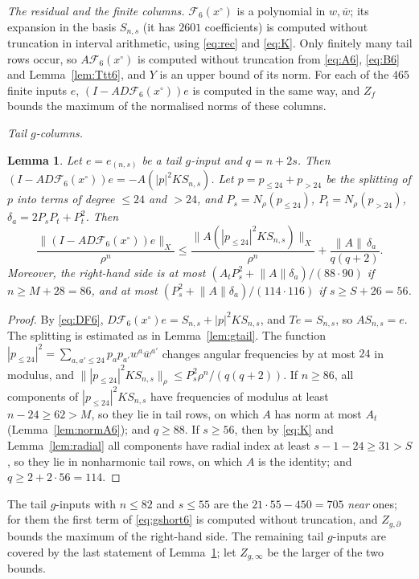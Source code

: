 \documentclass[11pt]{amsart}
\newtheorem{lemma}[theorem]{Lemma}
\theoremstyle{definition}
\theoremstyle{remark}
\numberwithin{equation}{section}
\newcommand{\Fc}{\mathcal{F}}
\newcommand{\bw}{\overline{w}}
\newcommand{\nrm}[1]{\lVert #1\rVert}
\begin{document}
\emph{The residual and the finite columns.} $\Fc_6(x^\circ)$ is a polynomial in $w,\bw$; its expansion in the basis $S_{n,s}$ (it has $2601$ coefficients) is computed without truncation in interval arithmetic, using \eqref{eq:rec} and \eqref{eq:K}. Only finitely many tail rows occur, so $A\Fc_6(x^\circ)$ is computed without truncation from \eqref{eq:A6}, \eqref{eq:B6} and Lemma~\ref{lem:Ttt6}, and $Y$ is an upper bound of its norm. For each of the $465$ finite inputs $e$, $(I-AD\Fc_6(x^\circ))e$ is computed in the same way, and $Z_f$ bounds the maximum of the normalised norms of these columns.

\emph{Tail $g$-columns.}

\begin{lemma}\label{lem:gtail6}
Let $e=e_{(n,s)}$ be a tail $g$-input and $q=n+2s$. Then $(I-AD\Fc_6(x^\circ))e=-A(|p|^2KS_{n,s})$. Let $p=p_{\leq24}+p_{>24}$ be the splitting of $p$ into terms of degree $\leq24$ and $>24$, and $P_s=N_\rho(p_{\leq24})$, $P_t=N_\rho(p_{>24})$, $\delta_a=2P_sP_t+P_t^2$. Then
\begin{equation}\label{eq:gshort6}
\frac{\nrm{(I-AD\Fc_6(x^\circ))e}_X}{\rho^n}\leq\frac{\nrm{A(|p_{\leq24}|^2KS_{n,s})}_X}{\rho^n}+\frac{\nrm A\,\delta_a}{q(q+2)} .
\end{equation}
Moreover, the right-hand side is at most $(A_tP_s^2+\nrm A\delta_a)/(88\cdot90)$ if $n\geq M+28=86$, and at most $(P_s^2+\nrm A\delta_a)/(114\cdot116)$ if $s\geq S+26=56$.
\end{lemma}

\begin{proof}
By \eqref{eq:DF6}, $D\Fc_6(x^\circ)e=S_{n,s}+|p|^2KS_{n,s}$, and $Te=S_{n,s}$, so $AS_{n,s}=e$. The splitting is estimated as in Lemma~\ref{lem:gtail}. The function $|p_{\leq24}|^2=\sum_{a,a'\leq24}p_ap_{a'}w^a\bw^{a'}$ changes angular frequencies by at most $24$ in modulus, and $\nrm{|p_{\leq24}|^2KS_{n,s}}_\rho\leq P_s^2\rho^n/(q(q+2))$. If $n\geq86$, all components of $|p_{\leq24}|^2KS_{n,s}$ have frequencies of modulus at least $n-24\geq62>M$, so they lie in tail rows, on which $A$ has norm at most $A_t$ (Lemma~\ref{lem:normA6}); and $q\geq88$. If $s\geq56$, then by \eqref{eq:K} and Lemma~\ref{lem:radial} all components have radial index at least $s-1-24\geq31>S$, so they lie in nonharmonic tail rows, on which $A$ is the identity; and $q\geq2+2\cdot56=114$.
\end{proof}

The tail $g$-inputs with $n\leq82$ and $s\leq55$ are the $21\cdot55-450=705$ \emph{near} ones; for them the first term of \eqref{eq:gshort6} is computed without truncation, and $Z_{g,\partial}$ bounds the maximum of the right-hand side. The remaining tail $g$-inputs are covered by the last statement of Lemma~\ref{lem:gtail6}; let $Z_{g,\infty}$ be the larger of the two bounds.
\end{document}
